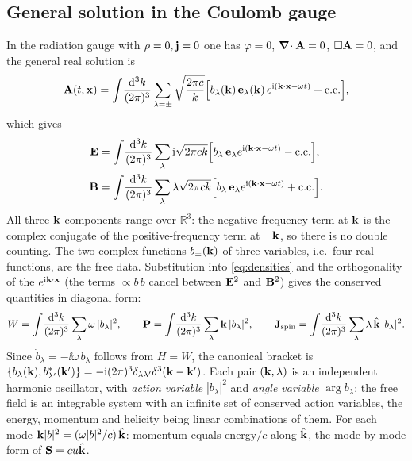 \subsection{General solution in the Coulomb gauge}

In the radiation gauge with $\rho=0,\mathbf{j}=0$ one has $\varphi=0$,
$\boldsymbol{\nabla}\!\cdot\mathbf{A}=0$, $\Box\mathbf{A}=0$, and the general real solution is
\begin{equation}\label{eq:modes}
\mathbf{A}(t,\mathbf{x})=\int\!\frac{\mathrm{d}^3k}{(2\pi)^3}\sum_{\lambda=\pm}\sqrt{\frac{2\pi c}{k}}\Big[b_\lambda(\mathbf{k})\,\mathbf e_\lambda(\mathbf{k})\,e^{\mathrm{i}(\mathbf{k}\cdot\mathbf{x}-\omega t)}+\text{c.c.}\Big],
\end{equation}
which gives
\begin{align}
\mathbf{E}&=\int\!\frac{\mathrm{d}^3k}{(2\pi)^3}\sum_\lambda\mathrm{i}\sqrt{2\pi ck}\Big[b_\lambda\,\mathbf e_\lambda e^{\mathrm{i}(\mathbf{k}\cdot\mathbf{x}-\omega t)}-\text{c.c.}\Big],\\
\mathbf{B}&=\int\!\frac{\mathrm{d}^3k}{(2\pi)^3}\sum_\lambda\lambda\sqrt{2\pi ck}\Big[b_\lambda\,\mathbf e_\lambda e^{\mathrm{i}(\mathbf{k}\cdot\mathbf{x}-\omega t)}+\text{c.c.}\Big].
\end{align}
All three $\mathbf{k}$ components range over $\mathbb R^3$: the negative-frequency
term at $\mathbf{k}$ is the complex conjugate of the positive-frequency term at
$-\mathbf{k}$, so there is no double counting.  The two complex functions
$b_\pm(\mathbf{k})$ of three variables, i.e.\ four real functions, are the free data.  Substitution into
\eqref{eq:densities} and the orthogonality of the $e^{\mathrm{i}\mathbf{k}\cdot\mathbf{x}}$
(the terms $\propto b\,b$ cancel between $\mathbf{E}^2$ and $\mathbf{B}^2$) gives the
conserved quantities in diagonal form:
\begin{equation}\label{eq:W-P-S}
W=\int\!\frac{\mathrm{d}^3k}{(2\pi)^3}\sum_\lambda\omega\,|b_\lambda|^2,\qquad
\mathbf P=\int\!\frac{\mathrm{d}^3k}{(2\pi)^3}\sum_\lambda\mathbf{k}\,|b_\lambda|^2,\qquad
\mathbf J_{\rm spin}=\int\!\frac{\mathrm{d}^3k}{(2\pi)^3}\sum_\lambda\lambda\,\hat{\mathbf{k}}\,|b_\lambda|^2 .
\end{equation}
Since $\dot b_\lambda=-\ii\omega\,b_\lambda$ follows from $H=W$, the
canonical bracket is $\{b_\lambda(\mathbf{k}),b^*_{\lambda'}(\mathbf{k}')\}=-\mathrm{i}(2\pi)^3\delta_{\lambda\lambda'}\delta^3(\mathbf{k}-\mathbf{k}')$.
Each pair $(\mathbf{k},\lambda)$ is an independent harmonic oscillator, with
\emph{action variable} $|b_\lambda|^2$ and \emph{angle variable}
$\arg b_\lambda$; the free field is an integrable system with an
infinite set of conserved action variables, the energy, momentum and
helicity being linear combinations of them.  For each mode $\mathbf{k}|b|^2=(\omega|b|^2/c)\,\hat{\mathbf{k}}$: momentum equals
energy$/c$ along $\hat{\mathbf{k}}$, the mode-by-mode form of $\mathbf{S}=cu\hat{\mathbf{k}}$.

